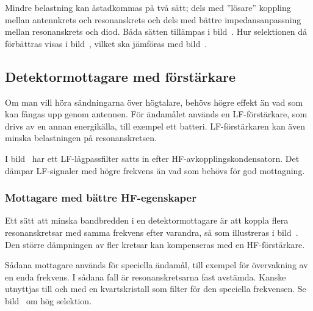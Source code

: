 Mindre belastning kan åstadkommas på två sätt; dels med ''lösare''
koppling mellan antennkrets och resonanskrets och dels med bättre
impedansanpassning mellan resonanskrets och diod.
Båda sätten tillämpas i bild~.
Hur selektionen då förbättras visas i bild~, vilket ska
jämföras med bild~.



\subsection{Detektormottagare med förstärkare}

Om man vill höra sändningarna över högtalare, behövs högre effekt än
vad som kan fångas upp genom antennen.
För ändamålet används en LF-förstärkare, som drivs av en annan energikälla,
till exempel ett batteri.
LF-förstärkaren kan även minska belastningen på resonanskretsen.

I bild~ har ett LF-lågpassfilter satts in efter
HF-avkopplingskondensatorn.
Det dämpar LF-signaler med högre frekvens än vad som behövs för god mottagning.

\subsubsection{Mottagare med bättre HF-egenskaper}
\label{mottagare_bättre_hf}

Ett sätt att minska bandbredden i en detektormottagare är att koppla
flera resonanskretsar med samma frekvens efter varandra, så som illustreras
i bild~.
Den större dämpningen av fler kretsar kan kompenseras med en HF-förstärkare.

Sådana mottagare används för speciella ändamål, till exempel för övervakning
av en enda frekvens.
I sådana fall är resonanskretsarna fast avstämda.
Kanske utnyttjas till och med en kvartskristall som filter för den speciella
frekvensen.
Se bild~ om hög selektion.



